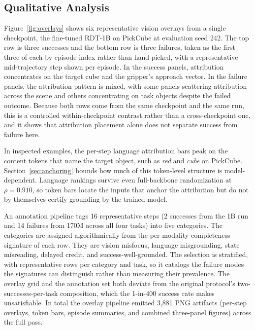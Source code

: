 \documentclass{article}
\begin{document}
\subsection{Qualitative Analysis}
\label{sec:qualitative}

Figure~\ref{fig:overlays} shows six representative vision overlays from a single checkpoint, the fine-tuned RDT-1B on PickCube at evaluation seed 242.
The top row is three successes and the bottom row is three failures, taken as the first three of each by episode index rather than hand-picked, with a representative mid-trajectory step shown per episode.
In the success panels, attribution concentrates on the target cube and the gripper's approach vector.
In the failure panels, the attribution pattern is mixed, with some panels scattering attribution across the scene and others concentrating on task objects despite the failed outcome.
Because both rows come from the same checkpoint and the same run, this is a controlled within-checkpoint contrast rather than a cross-checkpoint one, and it shows that attribution placement alone does not separate success from failure here.

In inspected examples, the per-step language attribution bars peak on the content tokens that name the target object, such as \emph{red} and \emph{cube} on PickCube.
Section~\ref{sec:anchoring} bounds how much of this token-level structure is model-dependent.
Language rankings survive even full-backbone randomization at $\rho = 0.910$, so token bars locate the inputs that anchor the attribution but do not by themselves certify grounding by the trained model.

An annotation pipeline tags 16 representative steps (2 successes from the 1B run and 14 failures from 170M across all four tasks) into five categories.
The categories are assigned algorithmically from the per-modality completeness signature of each row.
They are vision misfocus, language misgrounding, state misreading, delayed credit, and success-well-grounded.
The selection is stratified, with representative rows per category and task, so it catalogs the failure modes the signatures can distinguish rather than measuring their prevalence.
The overlay grid and the annotation set both deviate from the original protocol's two-successes-per-task composition, which the 1-in-400 success rate makes unsatisfiable.
In total the overlay pipeline emitted 3{,}881 PNG artifacts (per-step overlays, token bars, episode summaries, and combined three-panel figures) across the full pass.
\end{document}
